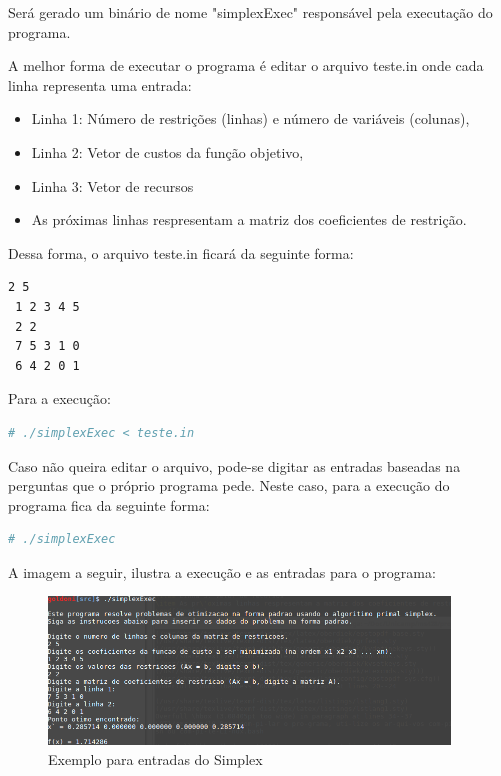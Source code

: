 \documentclass[a4paper]{article}
\begin{document}
Ser\'a gerado um bin\'ario de nome "simplexExec" respons\'avel pela executa\c{c}\~ao do programa.

A melhor forma de executar o programa \'e editar o arquivo teste.in onde cada linha representa uma entrada:

\begin{itemize}
\item Linha 1: N\'umero de restri\c{c}\~oes (linhas) e n\'umero de vari\'aveis (colunas),
\item Linha 2: Vetor de custos da fun\c{c}\~ao objetivo,
\item Linha 3: Vetor de recursos
\item As pr\'oximas linhas respresentam a matriz dos coeficientes de restri\c{c}\~ao.
\end{itemize}

Dessa forma, o arquivo teste.in ficar\'a da seguinte forma:

\begin{lstlisting}[language=bash]
 2 5
 1 2 3 4 5
 2 2
 7 5 3 1 0
 6 4 2 0 1
\end{lstlisting}

Para a execu\c{c}\~ao:

\begin{lstlisting}[language=bash]
  # ./simplexExec < teste.in
\end{lstlisting}

Caso n\~ao queira editar o arquivo, pode-se digitar as entradas baseadas na perguntas que o pr\'oprio programa pede. Neste caso, para a execu\c{c}\~ao do programa fica da seguinte forma:

\begin{lstlisting}[language=bash]
  # ./simplexExec 
\end{lstlisting}

A imagem a seguir, ilustra a execu\c{c}\~ao e as entradas para o programa:

\begin{figure}[ht!]
\caption{Exemplo para entradas do Simplex}
\includegraphics[width=0.95\textwidth]{simplexEntradas.png}
\end{figure}
\end{document}

